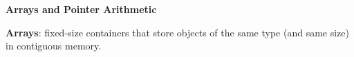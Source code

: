 \documentclass[7pt, twocolumn]{extarticle}
\begin{document}
\begin{small}



\smallskip
\textcolor{headcolor}{\textbf{Arrays and Pointer Arithmetic}}

\textbf{Arrays}: fixed-size containers that store objects of the same type (and same size) in contiguous memory.



\end{small}
\end{document}
